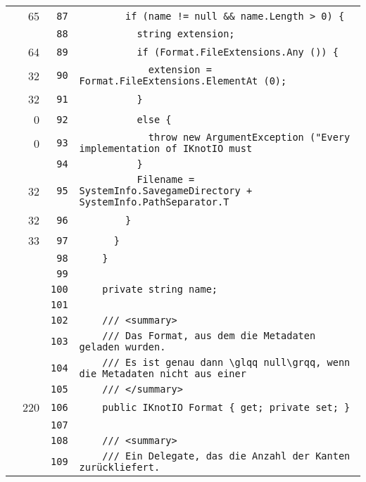 \documentclass[a4paper,10pt]{article}
\begin{document}
\begin{longtable}[l]{lrrl}
\cellcolor{green} & 65 & \verb~87~ & \verb~        if (name != null && name.Length > 0) {~\\
\cellcolor{gray} &  & \verb~88~ & \verb~          string extension;~\\
\cellcolor{green} & 64 & \verb~89~ & \verb~          if (Format.FileExtensions.Any ()) {~\\
\cellcolor{green} & 32 & \verb~90~ & \verb~            extension = Format.FileExtensions.ElementAt (0);~\\
\cellcolor{green} & 32 & \verb~91~ & \verb~          }~\\
\cellcolor{red} & 0 & \verb~92~ & \verb~          else {~\\
\cellcolor{red} & 0 & \verb~93~ & \verb~            throw new ArgumentException ("Every implementation of IKnotIO must~\\
\cellcolor{gray} &  & \verb~94~ & \verb~          }~\\
\cellcolor{green} & 32 & \verb~95~ & \verb~          Filename = SystemInfo.SavegameDirectory + SystemInfo.PathSeparator.T~\\
\cellcolor{green} & 32 & \verb~96~ & \verb~        }~\\
\cellcolor{green} & 33 & \verb~97~ & \verb~      }~\\
\cellcolor{gray} &  & \verb~98~ & \verb~    }~\\
\cellcolor{gray} &  & \verb~99~ & \verb~~\\
\cellcolor{gray} &  & \verb~100~ & \verb~    private string name;~\\
\cellcolor{gray} &  & \verb~101~ & \verb~~\\
\cellcolor{gray} &  & \verb~102~ & \verb~    /// <summary>~\\
\cellcolor{gray} &  & \verb~103~ & \verb~    /// Das Format, aus dem die Metadaten geladen wurden.~\\
\cellcolor{gray} &  & \verb~104~ & \verb~    /// Es ist genau dann \glqq null\grqq, wenn die Metadaten nicht aus einer ~\\
\cellcolor{gray} &  & \verb~105~ & \verb~    /// </summary>~\\
\cellcolor{green} & 220 & \verb~106~ & \verb~    public IKnotIO Format { get; private set; }~\\
\cellcolor{gray} &  & \verb~107~ & \verb~~\\
\cellcolor{gray} &  & \verb~108~ & \verb~    /// <summary>~\\
\cellcolor{gray} &  & \verb~109~ & \verb~    /// Ein Delegate, das die Anzahl der Kanten zurückliefert.~\\

\end{longtable}
\end{document}
